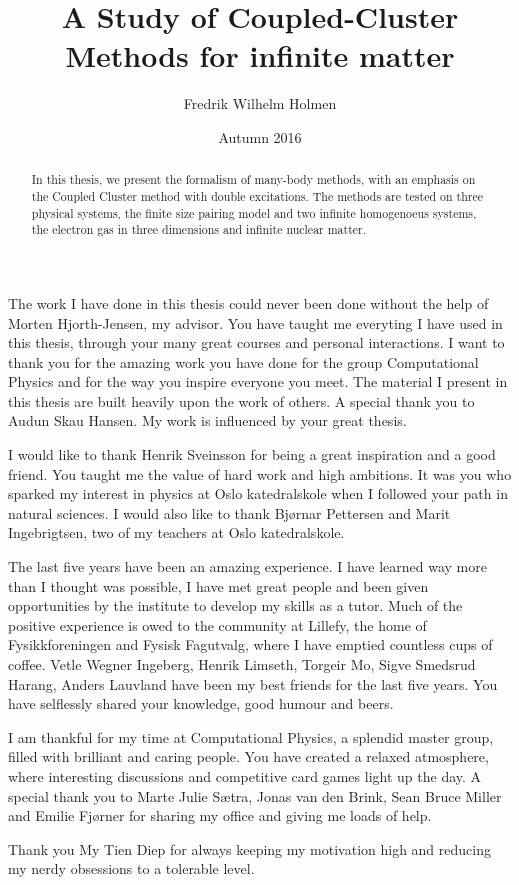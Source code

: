 \documentclass[twoside,english]{uiofysmaster}
\author{Fredrik Wilhelm Holmen}
\title{A Study of Coupled-Cluster Methods for infinite matter}
\date{Autumn 2016}
\begin{document}
\setlength{\belowdisplayskip}{12pt} \setlength{\belowdisplayshortskip}{12pt}
\setlength{\abovedisplayskip}{12pt} \setlength{\abovedisplayshortskip}{12pt}


\maketitle


\begin{abstract}
	In this thesis, we present the formalism of many-body methods, with an emphasis on the Coupled Cluster method with double excitations. The methods are tested on three physical systems, the finite size pairing model and two infinite homogenoeus systems, the electron gas in three dimensions and infinite nuclear matter. 
\end{abstract}

\begin{acknowledgements}
	The work I have done in this thesis could never been done without the help of Morten Hjorth-Jensen, my advisor. You have taught me everyting I have used in this thesis, through your many great courses and personal interactions. I want to thank you for the amazing work you have done for the group Computational Physics and for the way you inspire everyone you meet. The material I present in this thesis are built heavily upon the work of others. A special thank you to Audun Skau Hansen. My work is influenced by your great thesis. 

	I would like to thank Henrik Sveinsson for being a great inspiration and a good friend. You taught me the value of hard work and high ambitions. It was you who sparked my interest in physics at Oslo katedralskole when I followed your path in natural sciences. I would also like to thank Bj\o rnar Pettersen and Marit Ingebrigtsen, two of my teachers at Oslo katedralskole. 

	The last five years have been an amazing experience. I have learned way more than I thought was possible, I have met great people and been given opportunities by the institute to develop my skills as a tutor. Much of the positive experience is owed to the community at Lillefy, the home of Fysikkforeningen and Fysisk Fagutvalg, where I have emptied countless cups of coffee. Vetle Wegner Ingeberg, Henrik Limseth, Torgeir Mo, Sigve Smedsrud Harang, Anders Lauvland have been my best friends for the last five years. You have selflessly shared your knowledge, good humour and beers. 

	I am thankful for my time at Computational Physics, a splendid master group, filled with brilliant and caring people. You have created a relaxed atmosphere, where interesting discussions and competitive card games light up the day. A special thank you to Marte Julie Sætra, Jonas van den Brink, Sean Bruce Miller and Emilie Fj\o rner for sharing my office and giving me loads of help. 

	Thank you My Tien Diep for always keeping my motivation high and reducing my nerdy obsessions to a tolerable level.

\end{acknowledgements}
\end{document}
